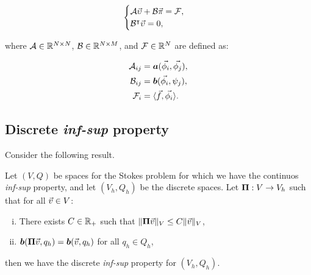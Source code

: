 \begin{gather} \label{matrix_stokes}
    \begin{cases}
        \mathcal{A} \vec{\upsilon} + \mathcal{B} \vec{\pi} = \mathcal{F}, \\
        \mathcal{B}^\intercal \vec{\upsilon} = 0,
    \end{cases}
\end{gather}

where $\mathcal{A} \in \mathbb{R}^{N \times N}$, $\mathcal{B} \in \mathbb{R}^{N \times M}$, and $\mathcal{F} \in \mathbb{R}^N$ are defined as:

\begin{align}
    \mathcal{A}_{ij} &= \bm{a}(\vec{\phi_i}, \vec{\phi_j}), \\ 
    \mathcal{B}_{ij} &= \bm{b}(\vec{\phi_i}, \psi_j), \\
    \mathcal{F}_i &= \langle \vec{f}, \vec{\phi_i} \rangle.
\end{align}

\newpage
\subsection{Discrete \textit{inf-sup} property}

Consider the following result.

\begin{lemma}[Fortin] \label{fortin}
    Let $(V, Q)$ be spaces for the Stokes problem for which we have the continuos \textit{inf-sup} property, and let $(V_h, Q_h)$ be the discrete spaces. Let $\bm{\Pi}: V \rightarrow V_h$ such that for all $\vec{v} \in V$:
    \begin{enumerate}[i.]
        \item There exists $C \in \mathbb{R}_+$ such that $\lVert \bm{\Pi} \vec{v} \rVert_V \leq C \lVert \vec{v} \rVert_V$,
        \item $\bm{b}(\bm{\Pi} \vec{v}, q_h) = \bm{b}(\vec{v}, q_h)$ for all $q_h \in Q_h$,
    \end{enumerate}
    then we have the discrete \textit{inf-sup} property for $(V_h, Q_h)$.
\end{lemma}